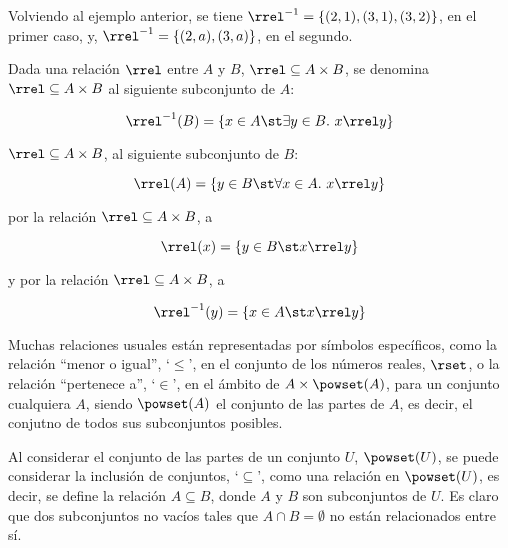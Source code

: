 \begin{example}
  Volviendo al ejemplo anterior, se tiene $\rrel^{-1} = \{(2, 1), (3, 1),
  (3, 2)\}$, en el primer caso, y, $\rrel^{-1} = \{(2, a), (3, a)\}$, en el
  segundo.
\end{example}

Dada una relación $\rrel$ entre $A$ y $B$, $\rrel \subseteq A \times B$, se
denomina  $\rrel \subseteq A \times
B$ al siguiente subconjunto de $A$:

\[ \rrel^{-1}(B) = \{x \in A \st \exists y \in B. \ x \rrel y\} \]

\noindent {} $\rrel \subseteq A \times
B$, al siguiente subconjunto de $B$:

\[ \rrel(A) = \{y \in B \st \forall x \in A. \ x \rrel y\} \]

\noindent {} por la relación
$\rrel \subseteq A \times B$, a

\[ \rrel(x) = \{y \in B \st x \rrel y\} \]

\noindent y  por la relación
$\rrel \subseteq A \times B$, a

\[ \rrel^{-1}(y) = \{x \in A \st x \rrel y\} \]

Muchas relaciones usuales están representadas por símbolos específicos, como
la relación ``menor o igual'', `$\leq$', en el conjunto de los números
reales, $\rset$, o la relación ``pertenece a'', `$\in$', en el ámbito de $A
\times \powset(A)$, para un conjunto cualquiera $A$, siendo $\powset(A)$ el
conjunto de las partes de $A$, es decir, el conjutno de todos sus
subconjuntos posibles.

\begin{example}
  Al considerar el conjunto de las partes de un conjunto $U$, $\powset(U)$,
  se puede considerar la inclusión de conjuntos, `$\subseteq$', como una
  relación en $\powset(U)$, es decir, se define la relación $A \subseteq B$,
  donde $A$ y $B$ son subconjuntos de $U$. Es claro que dos subconjuntos no
  vacíos tales que $A \cap B = \emptyset$ no están relacionados entre sí.
\end{example}

